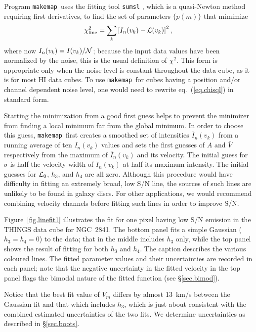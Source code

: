 \documentclass[letterpaper,fleqn,usenatbib]{mnras}
\def\mkm{{\tt makemap}}
\begin{document}
Program \mkm\ uses the fitting tool {\tt sumsl} \citep[from the
  software collection made public by][]{Bu17}, which is a quasi-Newton
method requiring first derivatives, to find the set of parameters
$\{p(m)\}$ that mimimize
\begin{equation}
\chi_{\rm line}^2 = \sum_k \left[ I_n(v_k) - {\cal L}(v_k) \right]^2,
\label{eq.chisql}
\end{equation}
where now $I_n(v_k) = I(v_k)/{\cal N}$; because the input data values
have been normalized by the noise, this is the usual definition of
$\chi^2$.  This form is appropriate only when the noise level is
constant throughout the data cube, as it is for most HI data cubes. To
use \mkm\ for cubes having a position and/or channel dependent noise
level, one would need to rewrite eq.~(\ref{eq.chisql}) in standard
form.

Starting the minimization from a good first guess helps to prevent the
minimizer from finding a local minimum far from the global minimum.
In order to choose this guess, \mkm\ first creates a smoothed set of
intensities $\bar I_n(v_k)$ from a running average of ten $I_n(v_k)$
values and sets the first guesses of $A$ and $\bar V$ respectively
from the maximum of $\bar I_n(v_k)$ and its velocity.  The initial
guess for $\sigma$ is half the velocity-width of $\bar I_n(v_k)$ at
half its maximum intensity.  The initial guesses for ${\cal L}_0$,
$h_3$, and $h_4$ are all zero.  Although this procedure would have
difficulty in fitting an extremely broad, low S/N line, the sources of
such lines are unlikely to be found in galaxy discs.  For other
applications, we would recommend combining velocity channels before
fitting such lines in order to improve S/N.

Figure~\ref{fig.linefit1} illustrates the fit for one pixel having low
S/N emission in the THINGS data cube for NGC~2841.  The bottom panel
fits a simple Gaussian ($h_3=h_4=0$) to the data; that in the middle
includes $h_3$ only, while the top panel shows the result of fitting
for both $h_3$ and $h_4$.  The caption describes the various coloured
lines.  The fitted parameter values and their uncertainties are
recorded in each panel; note that the negative uncertainty in the
fitted velocity in the top panel flags the bimodal nature of the
fitted function (see \S\ref{sec.bimod}).

Notice that the best fit value of $V_m$ differs by almost 13~km/s
between the Gaussian fit and that which includes $h_3$, which is just
about consistent with the combined estimated uncertainties of the two
fits.  We determine uncertainties as described in \S\ref{sec.boots}.
\end{document}
